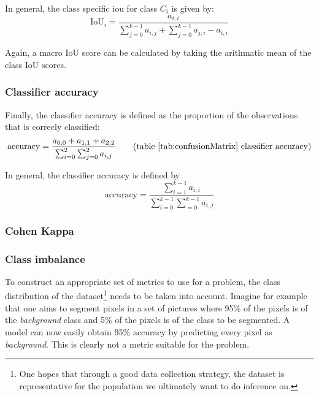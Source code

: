 In general, the class specific \acrfull{iou} for class $C_i$ is given by:
\begin{equation}
    \text{IoU}_i = \frac{a_{i,i}}{\sum_{j=0}^{k-1} a_{i, j} + \sum_{j=0}^{k-1} a_{j,i} - a_{i,i}} 
\end{equation}

Again, a macro IoU score can be calculated by taking the arithmatic mean of the class IoU scores.

\subsubsection{Classifier accuracy}

Finally, the classifier accuracy is defined as the proportion of the observations that is correcly classified:
\begin{equation}
    \text{accuracy} = \frac{a_{0,0} + a_{1,1} + a_{2,2}}{\sum_{i=0}^{2} \sum_{j=0}^{2} a_{i,j}   } \tag{table \ref{tab:confusionMatrix} classifier accuracy}
\end{equation}

In general, the classifier accuracy is defined by 
\begin{equation}
    \text{accuracy} = \frac{\sum_{i=1}^{k-1}a_{i,i}}{\sum_{i=0}^{k-1} \sum_{=0}^{k-1} a_{i,j}   } 
\end{equation}

\subsubsection{Cohen Kappa}


\subsubsection{Class imbalance}

To construct an appropriate set of metrics to use for a problem, the class distribution of the dataset\footnote{
    One hopes that through a good data collection strategy, the dataset is representative for the population we ultimately want to do inference on.
    } needs to be taken into account.
Imagine for example that one aims to segment pixels in a set of pictures where 95\% of the pixels is of the \textit{background} class and 5\% of the pixels is of the class to be segmented.
A model can now easily obtain 95\% accuracy by predicting every pixel as \textit{background}. This is clearly not a metric suitable for the problem.

